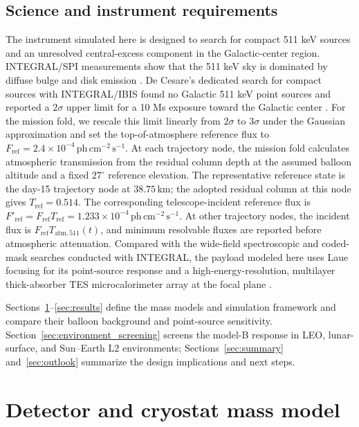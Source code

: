 \documentclass[11pt]{article}
\newcommand{\phcms}{\ensuremath{\,\mathrm{ph\,cm^{-2}\,s^{-1}}}}
\newcommand{\fref}{F_{\mathrm{ref}}}
\begin{document}
\subsection{Science and instrument requirements}
\label{sec:requirements}

\begingroup
{}

The instrument simulated here is designed to search for compact 511 keV sources
and an unresolved central-excess component in the Galactic-center region.
INTEGRAL/SPI measurements show that the 511 keV sky is dominated by diffuse
bulge and disk emission \cite{Siegert2016AA,Yoneda2025}. De Cesare's dedicated
search for compact sources with INTEGRAL/IBIS found no Galactic 511 keV point
sources and reported a $2\sigma$ upper limit for a 10 Ms exposure toward the
Galactic center \cite{DeCesare2011}. For the mission fold, we rescale this limit
linearly from $2\sigma$ to $3\sigma$ under the Gaussian approximation and set
the top-of-atmosphere reference flux to
$\fref=2.4\times10^{-4}\phcms$. At each trajectory node, the
mission fold calculates atmospheric transmission from the residual column depth
at the assumed balloon altitude and a fixed $27^\circ$ reference elevation.
The representative reference state is the day-15 trajectory node at
$38.75\,\mathrm{km}$; the adopted residual column at this node gives
$T_{\mathrm{ref}}=0.514$. The corresponding telescope-incident reference
flux is $F'_{\mathrm{ref}}=\fref T_{\mathrm{ref}}=
1.233\times10^{-4}\phcms$. At other trajectory nodes, the incident flux is
$\fref T_{\mathrm{atm},511}(t)$, and minimum resolvable fluxes are reported
before atmospheric attenuation. Compared with the wide-field
spectroscopic and coded-mask searches conducted with INTEGRAL, the payload
modeled here uses Laue focusing for its point-source response and a
high-energy-resolution, multilayer thick-absorber TES microcalorimeter array at
the focal plane \cite{Shirazi2023,Caputo2017}.



Sections~\ref{sec:geometry}--\ref{sec:results} define the mass models and
simulation framework and compare their balloon background and point-source
sensitivity. Section~\ref{sec:environment_screening} screens the model-B
response in LEO, lunar-surface, and Sun--Earth L2 environments;
Sections~\ref{sec:summary} and~\ref{sec:outlook} summarize the design
implications and next steps.

\endgroup

\section{Detector and cryostat mass model}
\label{sec:geometry}
\end{document}
